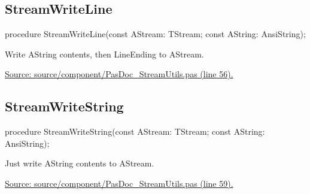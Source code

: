 \documentclass{report}
\newif\ifpdf
\begin{document}
\subsection*{StreamWriteLine}
\fi
\label{PasDoc_StreamUtils-StreamWriteLine}
\begin{list}{}{
\setlength{\itemindent}{0cm}
\setlength{\listparindent}{0cm}
\setlength{\leftmargin}{\evensidemargin}
\addtolength{\leftmargin}{\tmplength}
\settowidth{\labelsep}{X}
\addtolength{\leftmargin}{\labelsep}
\setlength{\labelwidth}{\tmplength}
}
\item[\textbf{Declaration}\hfill]
\ifpdf
\begin{flushleft}
\fi
\begin{ttfamily}
procedure StreamWriteLine(const AStream: TStream; const AString: AnsiString);\end{ttfamily}

\ifpdf
\end{flushleft}
\fi

\par
\item[\textbf{Description}]
Write AString contents, then LineEnding to AStream.\par
\href{https://github.com/pasdoc/pasdoc/blob/master/source/component/PasDoc_StreamUtils.pas#L56}{Source: source/component/PasDoc{\_}StreamUtils.pas (line 56).}

\end{list}
\ifpdf
\subsection*{\large{\textbf{StreamWriteString}}\normalsize\hspace{1ex}\hrulefill}
\else
\subsection*{StreamWriteString}
\fi
\label{PasDoc_StreamUtils-StreamWriteString}
\begin{list}{}{
\setlength{\itemindent}{0cm}
\setlength{\listparindent}{0cm}
\setlength{\leftmargin}{\evensidemargin}
\addtolength{\leftmargin}{\tmplength}
\settowidth{\labelsep}{X}
\addtolength{\leftmargin}{\labelsep}
\setlength{\labelwidth}{\tmplength}
}
\item[\textbf{Declaration}\hfill]
\ifpdf
\begin{flushleft}
\fi
\begin{ttfamily}
procedure StreamWriteString(const AStream: TStream; const AString: AnsiString);\end{ttfamily}

\ifpdf
\end{flushleft}
\fi

\par
\item[\textbf{Description}]
Just write AString contents to AStream.\par
\href{https://github.com/pasdoc/pasdoc/blob/master/source/component/PasDoc_StreamUtils.pas#L59}{Source: source/component/PasDoc{\_}StreamUtils.pas (line 59).}

\end{list}
\end{document}

